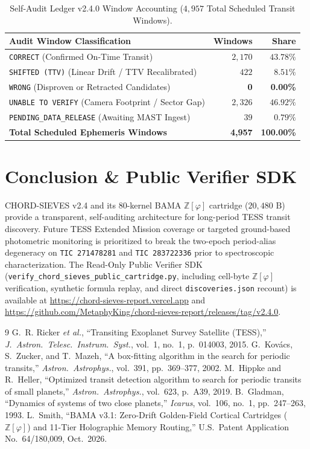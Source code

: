 \documentclass[10pt,twocolumn]{article}
\begin{document}
\begin{table}[h]
\centering
\caption{Self-Audit Ledger v2.4.0 Window Accounting ($4{,}957$ Total Scheduled Transit Windows).}
\label{tab:audit}
\footnotesize
\begin{tabular}{@{}lrr@{}}
\toprule
\textbf{Audit Window Classification} & \textbf{Windows} & \textbf{Share} \\
\midrule
\texttt{CORRECT} (Confirmed On-Time Transit) & $2{,}170$ & $43.78\%$ \\
\texttt{SHIFTED (TTV)} (Linear Drift / TTV Recalibrated) & $422$ & $8.51\%$ \\
\texttt{WRONG} (Disproven or Retracted Candidates) & \textbf{0} & \textbf{0.00\%} \\
\texttt{UNABLE TO VERIFY} (Camera Footprint / Sector Gap) & $2{,}326$ & $46.92\%$ \\
\texttt{PENDING\_DATA\_RELEASE} (Awaiting MAST Ingest) & $39$ & $0.79\%$ \\
\midrule
\textbf{Total Scheduled Ephemeris Windows} & \textbf{4,957} & \textbf{100.00\%} \\
\bottomrule
\end{tabular}
\end{table}

\section{Conclusion \& Public Verifier SDK}
CHORD-SIEVES v2.4 and its 80-kernel BAMA $\mathbb{Z}[\varphi]$ cartridge ($20{,}480\text{ B}$) provide a transparent, self-auditing architecture for long-period TESS transit discovery. Future TESS Extended Mission coverage or targeted ground-based photometric monitoring is prioritized to break the two-epoch period-alias degeneracy on \texttt{TIC~271478281} and \texttt{TIC~283722336} prior to spectroscopic characterization. The Read-Only Public Verifier SDK (\texttt{verify\_chord\_sieves\_public\_cartridge.py}, including cell-byte $\mathbb{Z}[\varphi]$ verification, synthetic formula replay, and direct \texttt{discoveries.json} recount) is available at \url{https://chord-sieves-report.vercel.app} and \url{https://github.com/MetaphyKing/chord-sieves-report/releases/tag/v2.4.0}.

\begin{thebibliography}{9}
G.~R. Ricker \emph{et al.}, ``Transiting Exoplanet Survey Satellite (TESS),'' \emph{J.\ Astron.\ Telesc.\ Instrum.\ Syst.}, vol.~1, no.~1, p.~014003, 2015.
G.~Kov\'{a}cs, S.~Zucker, and T.~Mazeh, ``A box-fitting algorithm in the search for periodic transits,'' \emph{Astron.\ Astrophys.}, vol.~391, pp.~369--377, 2002.
M.~Hippke and R.~Heller, ``Optimized transit detection algorithm to search for periodic transits of small planets,'' \emph{Astron.\ Astrophys.}, vol.~623, p.~A39, 2019.
B.~Gladman, ``Dynamics of systems of two close planets,'' \emph{Icarus}, vol.~106, no.~1, pp.~247--263, 1993.
L.~Smith, ``BAMA v3.1: Zero-Drift Golden-Field Cortical Cartridges ($\mathbb{Z}[\varphi]$) and 11-Tier Holographic Memory Routing,'' U.S.\ Patent Application No.\ 64/180,009, Oct.\ 2026.
\end{thebibliography}
\end{document}
